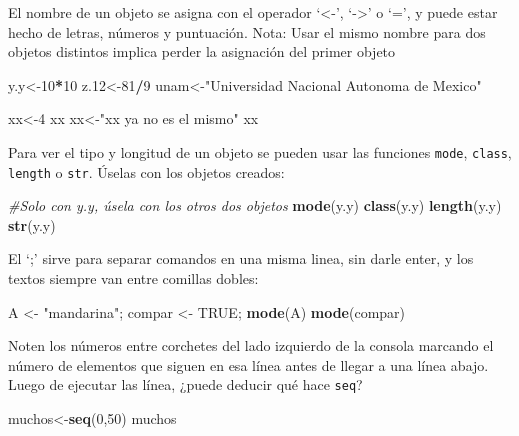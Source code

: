 \documentclass[
]{article}
\newenvironment{Shaded}{\begin{snugshade}}{\end{snugshade}}
\newcommand{\CommentTok}[1]{\textcolor[rgb]{0.56,0.35,0.01}{\textit{#1}}}
\newcommand{\DecValTok}[1]{\textcolor[rgb]{0.00,0.00,0.81}{#1}}
\newcommand{\FloatTok}[1]{\textcolor[rgb]{0.00,0.00,0.81}{#1}}
\newcommand{\KeywordTok}[1]{\textcolor[rgb]{0.13,0.29,0.53}{\textbf{#1}}}
\newcommand{\NormalTok}[1]{#1}
\newcommand{\OperatorTok}[1]{\textcolor[rgb]{0.81,0.36,0.00}{\textbf{#1}}}
\newcommand{\OtherTok}[1]{\textcolor[rgb]{0.56,0.35,0.01}{#1}}
\newcommand{\StringTok}[1]{\textcolor[rgb]{0.31,0.60,0.02}{#1}}
\begin{document}
El nombre de un objeto se asigna con el operador `\textless-',
`-\textgreater{}' o `=', y puede estar hecho de letras, números y
puntuación. Nota: Usar el mismo nombre para dos objetos distintos
implica perder la asignación del primer objeto

\begin{Shaded}
\begin{Highlighting}[]
\NormalTok{y.y<-}\DecValTok{10}\OperatorTok{*}\DecValTok{10}
\NormalTok{z}\FloatTok{.12}\NormalTok{<-}\DecValTok{81}\OperatorTok{/}\DecValTok{9}
\NormalTok{unam<-}\StringTok{"Universidad Nacional Autonoma de Mexico"}

\NormalTok{xx<-}\DecValTok{4}
\NormalTok{xx}
\NormalTok{xx<-}\StringTok{"xx ya no es el mismo"}
\NormalTok{xx}
\end{Highlighting}
\end{Shaded}

Para ver el tipo y longitud de un objeto se pueden usar las funciones
\texttt{mode}, \texttt{class}, \texttt{length} o \texttt{str}. Úselas
con los objetos creados:

\begin{Shaded}
\begin{Highlighting}[]
\CommentTok{#Solo con y.y, úsela con los otros dos objetos}
\KeywordTok{mode}\NormalTok{(y.y)}
\KeywordTok{class}\NormalTok{(y.y)}
\KeywordTok{length}\NormalTok{(y.y)}
\KeywordTok{str}\NormalTok{(y.y)}
\end{Highlighting}
\end{Shaded}

El `;' sirve para separar comandos en una misma linea, sin darle enter,
y los textos siempre van entre comillas dobles:

\begin{Shaded}
\begin{Highlighting}[]
\NormalTok{A <-}\StringTok{ "mandarina"}\NormalTok{; compar <-}\StringTok{ }\OtherTok{TRUE}\NormalTok{; }\KeywordTok{mode}\NormalTok{(A)}
\KeywordTok{mode}\NormalTok{(compar)}
\end{Highlighting}
\end{Shaded}

Noten los números entre corchetes del lado izquierdo de la consola
marcando el número de elementos que siguen en esa línea antes de llegar
a una línea abajo. Luego de ejecutar las línea, ¿puede deducir qué hace
\texttt{seq}?

\begin{Shaded}
\begin{Highlighting}[]
\NormalTok{muchos<-}\KeywordTok{seq}\NormalTok{(}\DecValTok{0}\NormalTok{,}\DecValTok{50}\NormalTok{)}
\NormalTok{muchos}
\end{Highlighting}
\end{Shaded}
\end{document}
